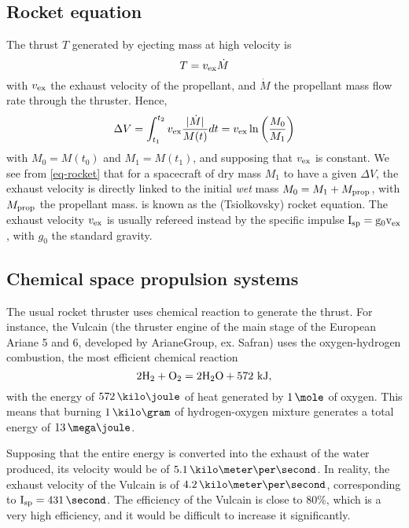 \subsection*{Rocket equation}
The thrust $T$ generated by ejecting mass at high velocity is
\begin{equation} \label{eq-thurst}
  T = v_{\rm ex} \dot{M}
\end{equation}
with $v_{\rm ex}$ the exhaust velocity of the propellant, and $\dot{M}$ the propellant mass flow rate through the thruster.
Hence,
\begin{equation} \label{eq-rocket}
  \Delta V = \int_{t_1}^{t_2} v_{\rm ex} \frac{ \lvert\dot{M}\rvert}{M(t)} dt = v_{\rm ex} \ln \left( \frac{M_0}{M_1} \right)
\end{equation}
with $M_0 = M(t_0)$ and $M_1=M(t_1)$, and supposing that $v_{\rm ex}$ is constant.
We see from \cref{eq-rocket} that for a spacecraft of dry mass $M_1$ to have a given $\Delta V$, the exhaust velocity is directly linked to the initial \emph{wet} mass $M_0 = M_1 + M_{\rm prop}$, with $M_{\rm prop}$ the propellant mass.
 is known as the (Tsiolkovsky) rocket equation.
The exhaust velocity $v_{\rm ex}$ is usually refereed instead by the specific impulse $\rm I_{\rm sp} = g_0 v_{\rm ex}$, with $g_0$ the standard gravity.

\subsection*{Chemical space propulsion systems}
The usual rocket thruster uses chemical reaction to generate the thrust.
For instance, the Vulcain (the thruster engine of the main stage of the European Ariane 5 and 6, developed by ArianeGroup, ex. Safran) uses the oxygen-hydrogen combustion, the most efficient chemical reaction \citep{nasa-H2O2}
\begin{equation*}
  2 {\rm H_2} + { \rm O_2} = 2 {\rm H_2 O} + 572 \text{~kJ},
\end{equation*}
with the energy of $572\,\kilo\joule$ of heat generated by $1\,\mole$ of oxygen.
This means that burning $1\,\kilo\gram$ of hydrogen-oxygen mixture generates a total energy of $13\,\mega\joule$. 

Supposing that the entire energy is converted into the exhaust of the water produced, its velocity would be of $5.1 \,\kms$.
In reality, the exhaust velocity of the Vulcain is of $4.2 \,\kms$, corresponding to $\Isp=431 \,\second$.
The efficiency of the Vulcain is close to 80\%, which is a very high efficiency, and it would be difficult to increase it significantly. 

